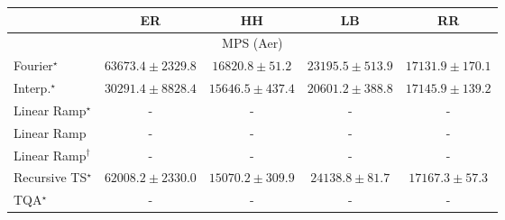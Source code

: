 \begin{tabular}{l|cccc|}
\toprule
            & ER & HH & LB & RR \\
\midrule
\multicolumn{5}{c}{\rule{0pt}{8pt}MPS (Aer)} \\
\midrule
Fourier$^\star$ & {\cellcolor[HTML]{800F7B}} \color[HTML]{F1F1F1} $63673.4\pm 2329.8$ & {\cellcolor[HTML]{EBF3F8}} \color[HTML]{000000} $16820.8\pm 51.2$ & {\cellcolor[HTML]{D2E2EE}} \color[HTML]{000000} $23195.5\pm 513.9$ & {\cellcolor[HTML]{EAF3F8}} \color[HTML]{000000} $17131.9\pm 170.1$ \\
Interp.$^\star$ & {\cellcolor[HTML]{B2CAE1}} \color[HTML]{000000} $30291.4\pm 8828.4$ & {\cellcolor[HTML]{EFF6FA}} \color[HTML]{000000} $15646.5\pm 437.4$ & {\cellcolor[HTML]{DFEBF4}} \color[HTML]{000000} $20601.2\pm 388.8$ & {\cellcolor[HTML]{EAF3F8}} \color[HTML]{000000} $17145.9\pm 139.2$ \\
Linear Ramp$^\star$ & {\cellcolor[HTML]{000000}} \color[HTML]{F1F1F1} {\cellcolor{white}} \color{black} - & {\cellcolor[HTML]{000000}} \color[HTML]{F1F1F1} {\cellcolor{white}} \color{black} - & {\cellcolor[HTML]{000000}} \color[HTML]{F1F1F1} {\cellcolor{white}} \color{black} - & {\cellcolor[HTML]{000000}} \color[HTML]{F1F1F1} {\cellcolor{white}} \color{black} - \\
Linear Ramp & {\cellcolor[HTML]{000000}} \color[HTML]{F1F1F1} {\cellcolor{white}} \color{black} - & {\cellcolor[HTML]{000000}} \color[HTML]{F1F1F1} {\cellcolor{white}} \color{black} - & {\cellcolor[HTML]{000000}} \color[HTML]{F1F1F1} {\cellcolor{white}} \color{black} - & {\cellcolor[HTML]{000000}} \color[HTML]{F1F1F1} {\cellcolor{white}} \color{black} - \\
Linear Ramp$^\dagger$ & {\cellcolor[HTML]{000000}} \color[HTML]{F1F1F1} {\cellcolor{white}} \color{black} - & {\cellcolor[HTML]{000000}} \color[HTML]{F1F1F1} {\cellcolor{white}} \color{black} - & {\cellcolor[HTML]{000000}} \color[HTML]{F1F1F1} {\cellcolor{white}} \color{black} - & {\cellcolor[HTML]{000000}} \color[HTML]{F1F1F1} {\cellcolor{white}} \color{black} - \\
Recursive TS$^\star$ & {\cellcolor[HTML]{831A83}} \color[HTML]{F1F1F1} $62008.2\pm 2330.0$ & {\cellcolor[HTML]{F1F7FA}} \color[HTML]{000000} $15070.2\pm 309.9$ & {\cellcolor[HTML]{CEDFEC}} \color[HTML]{000000} $24138.8\pm 81.7$ & {\cellcolor[HTML]{EAF3F8}} \color[HTML]{000000} $17167.3\pm 57.3$ \\
TQA$^\star$ & {\cellcolor[HTML]{000000}} \color[HTML]{F1F1F1} {\cellcolor{white}} \color{black} - & {\cellcolor[HTML]{000000}} \color[HTML]{F1F1F1} {\cellcolor{white}} \color{black} - & {\cellcolor[HTML]{000000}} \color[HTML]{F1F1F1} {\cellcolor{white}} \color{black} - & {\cellcolor[HTML]{000000}} \color[HTML]{F1F1F1} {\cellcolor{white}} \color{black} - \\

\end{tabular}

